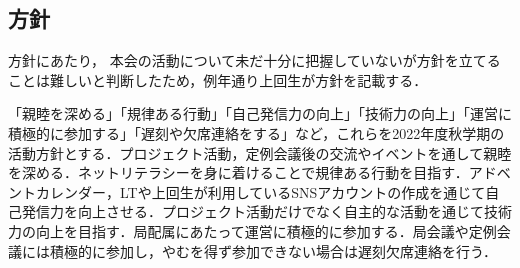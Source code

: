 \subsection*{\firstGrade{}方針}


\firstGrade{}方針にあたり，
本会の活動について未だ十分に把握していない\firstGrade{}が方針を立てることは難しいと判断したため，例年通り上回生が\firstGrade{}方針を記載する．

「親睦を深める」「規律ある行動」「自己発信力の向上」「技術力の向上」「運営に積極的に参加する」「遅刻や欠席連絡をする」など，これらを\firstGrade{}2022年度秋学期の活動方針とする．プロジェクト活動，定例会議後の交流やイベントを通して親睦を深める．ネットリテラシーを身に着けることで規律ある行動を目指す．アドベントカレンダー，LTや上回生が利用しているSNSアカウントの作成を通じて自己発信力を向上させる．プロジェクト活動だけでなく自主的な活動を通じて技術力の向上を目指す．局配属にあたって運営に積極的に参加する．局会議や定例会議には積極的に参加し，やむを得ず参加できない場合は遅刻欠席連絡を行う．
